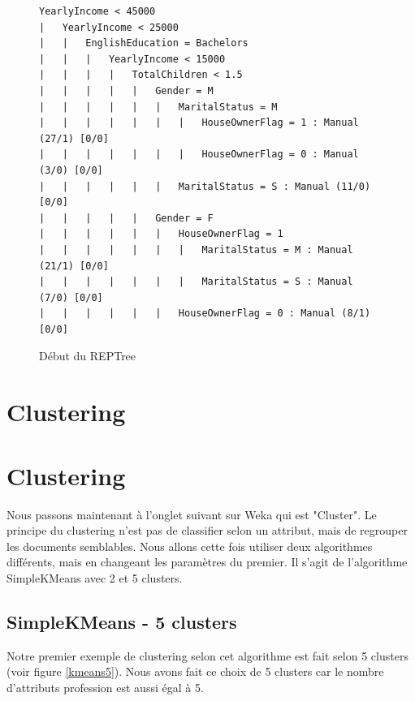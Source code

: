 \begin{figure}[H]
\centering
\begin{lstlisting}
YearlyIncome < 45000
|   YearlyIncome < 25000
|   |   EnglishEducation = Bachelors
|   |   |   YearlyIncome < 15000
|   |   |   |   TotalChildren < 1.5
|   |   |   |   |   Gender = M
|   |   |   |   |   |   MaritalStatus = M
|   |   |   |   |   |   |   HouseOwnerFlag = 1 : Manual (27/1) [0/0]
|   |   |   |   |   |   |   HouseOwnerFlag = 0 : Manual (3/0) [0/0]
|   |   |   |   |   |   MaritalStatus = S : Manual (11/0) [0/0]
|   |   |   |   |   Gender = F
|   |   |   |   |   |   HouseOwnerFlag = 1
|   |   |   |   |   |   |   MaritalStatus = M : Manual (21/1) [0/0]
|   |   |   |   |   |   |   MaritalStatus = S : Manual (7/0) [0/0]
|   |   |   |   |   |   HouseOwnerFlag = 0 : Manual (8/1) [0/0]
\end{lstlisting}
\caption{Début du REPTree}
\label{lst:reptree_sample}
\end{figure}


\section{Clustering}

\section{Clustering}

    Nous passons maintenant à l'onglet suivant sur Weka qui est "Cluster". Le principe du clustering n'est pas de classifier selon un attribut, mais de regrouper les documents semblables. Nous allons cette fois utiliser deux algorithmes différents, mais en changeant les paramètres du premier. Il s'agit de l'algorithme SimpleKMeans avec 2 et 5 clusters.


\subsection*{SimpleKMeans - 5 clusters}
    
    Notre premier exemple de clustering selon cet algorithme est fait selon 5 clusters (voir figure \ref{kmeans5}). Nous avons fait ce choix de 5 clusters car le nombre d'attributs profession est aussi égal à 5.

